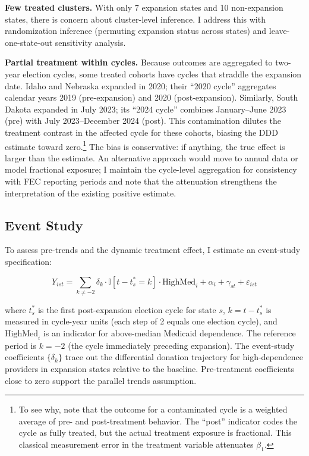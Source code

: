 \documentclass[12pt]{article}
\newcommand{\ind}{\mathbb{I}}
\begin{document}
\textbf{Few treated clusters.} With only 7 expansion states and 10 non-expansion states, there is concern about cluster-level inference. I address this with randomization inference (permuting expansion status across states) and leave-one-state-out sensitivity analysis.

\textbf{Partial treatment within cycles.} Because outcomes are aggregated to two-year election cycles, some treated cohorts have cycles that straddle the expansion date. Idaho and Nebraska expanded in 2020; their ``2020 cycle'' aggregates calendar years 2019 (pre-expansion) and 2020 (post-expansion). Similarly, South Dakota expanded in July 2023; its ``2024 cycle'' combines January--June 2023 (pre) with July 2023--December 2024 (post). This contamination dilutes the treatment contrast in the affected cycle for these cohorts, biasing the DDD estimate toward zero.\footnote{To see why, note that the outcome for a contaminated cycle is a weighted average of pre- and post-treatment behavior. The ``post'' indicator codes the cycle as fully treated, but the actual treatment exposure is fractional. This classical measurement error in the treatment variable attenuates $\beta_1$.} The bias is conservative: if anything, the true effect is larger than the estimate. An alternative approach would move to annual data or model fractional exposure; I maintain the cycle-level aggregation for consistency with FEC reporting periods and note that the attenuation strengthens the interpretation of the existing positive estimate.

\subsection{Event Study}

To assess pre-trends and the dynamic treatment effect, I estimate an event-study specification:

\begin{equation}\label{eq:eventstudy}
    Y_{ist} = \sum_{k \neq -2} \delta_k \cdot \ind[t - t_s^* = k] \cdot \text{HighMed}_i + \alpha_i + \gamma_{st} + \varepsilon_{ist}
\end{equation}

\noindent where $t_s^*$ is the first post-expansion election cycle for state $s$, $k = t - t_s^*$ is measured in cycle-year units (each step of 2 equals one election cycle), and $\text{HighMed}_i$ is an indicator for above-median Medicaid dependence. The reference period is $k = -2$ (the cycle immediately preceding expansion). The event-study coefficients $\{\delta_k\}$ trace out the differential donation trajectory for high-dependence providers in expansion states relative to the baseline. Pre-treatment coefficients close to zero support the parallel trends assumption.
\end{document}
